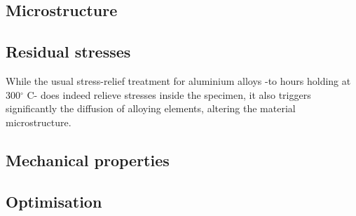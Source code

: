 \subsection{Microstructure}

\subsection{Residual stresses}

While the usual stress-relief treatment for aluminium alloys -to hours holding at 300$^\circ$ C- does indeed relieve stresses inside the specimen, it also triggers significantly the diffusion of alloying elements, altering the material microstructure.

\subsection{Mechanical properties}
\label{D-MP}

\subsection{Optimisation}



